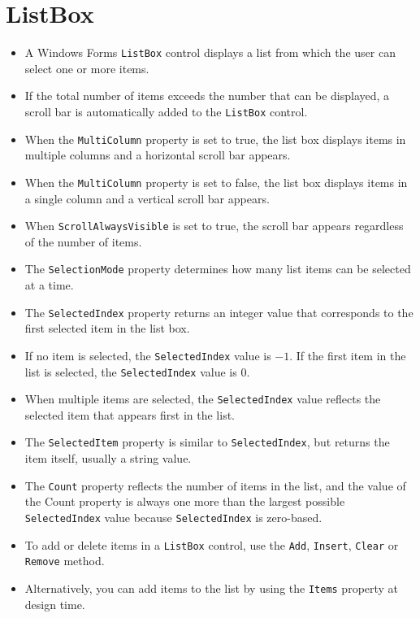 \section{ListBox}
\begin{multicols}{2}
	\begin{itemize}
		\item A Windows Forms \texttt{ListBox} control displays a list from which the user can select one or more items.
		\item If the total number of items exceeds the number that can be displayed, a scroll bar is automatically
		added to the \texttt{ListBox} control. 
		\item When the \texttt{MultiColumn} property is set to true, the list box displays
		items in multiple columns and a horizontal scroll bar appears. 
		\item When the \texttt{MultiColumn} property is
		set to false, the list box displays items in a single column and a vertical scroll bar appears. 
		\item When \texttt{ScrollAlwaysVisible} is set to true, the scroll bar appears regardless of the number of items. 
		\item The \texttt{SelectionMode} property determines how many list items can be selected at a time.
		\item The \texttt{SelectedIndex} property returns an integer value that corresponds to the first selected item in the
		list box.
		\item If no item is	selected, the \texttt{SelectedIndex} value is $ -1 $. If the first item in the list is selected, the \texttt{SelectedIndex}
		value is $ 0 $. 
		\item When multiple items are selected, the \texttt{SelectedIndex} value reflects the selected item that appears first in the list. 
		\item The \texttt{SelectedItem} property is similar to \texttt{SelectedIndex}, but returns the item itself, usually a string value. 
		\item The \texttt{Count} property reflects the number of items in the list, and the	value of the Count property is always one more than the largest possible \texttt{SelectedIndex} value because \texttt{SelectedIndex} is zero-based.
		\item To add or delete items in a \texttt{ListBox} control, use the \texttt{Add}, \texttt{Insert}, \texttt{Clear} or \texttt{Remove} method.
		\item Alternatively, you can add items to the list by using the \texttt{Items} property at design time.
	\end{itemize}
\end{multicols}

